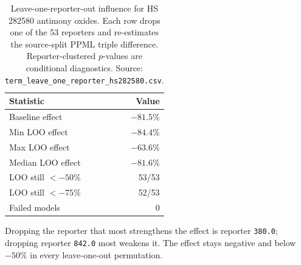 \begin{table}[H]
\centering
\caption{Leave-one-reporter-out influence for HS 282580 antimony
oxides. Each row drops one of the 53 reporters and re-estimates the
source-split PPML triple difference. Reporter-clustered $p$-values
are conditional diagnostics. Source:
\texttt{term\_leave\_one\_reporter\_hs282580.csv}.}
\label{tab:loro}
\footnotesize
\begin{tabular}{lr}
\toprule
Statistic & Value \\
\midrule
Baseline effect & $-81.5\%$ \\
Min LOO effect & $-84.4\%$ \\
Max LOO effect & $-63.6\%$ \\
Median LOO effect & $-81.6\%$ \\
LOO still $< -50\%$ & 53/53 \\
LOO still $< -75\%$ & 52/53 \\
Failed models & 0 \\
\bottomrule
\end{tabular}
\end{table}

\smallskip
\footnotesize Dropping the reporter that most strengthens the
effect is reporter \texttt{380.0}; dropping reporter \texttt{842.0} most weakens it. The effect stays negative and below $-50\%$ in every leave-one-out permutation.
